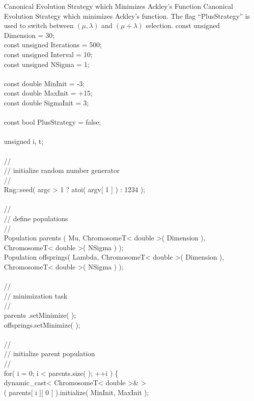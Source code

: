 \begin{programlisting}{Canonical Evolution Strategy which Minimizes Ackley's Function}{
    Canonical Evolution Strategy which minimizes Ackley's function.
    The flag ``PlusStrategy'' is used to switch between $(\mu,\lambda)$
    and $(\mu+\lambda)$ selection.}
    const unsigned Dimension    = 30;\\
    const unsigned Iterations   = 500;\\
    const unsigned Interval     = 10;\\
    const unsigned NSigma       = 1;\\
\\
    const double   MinInit      = -3;\\
    const double   MaxInit      = +15;\\
    const double   SigmaInit    = 3;\\
\\
    const bool     PlusStrategy = false;\\
\\
    unsigned       i, t;\\
\\
    //\\
    // initialize random number generator\\
    //\\
    Rng::seed( argc > 1 ? atoi( argv[ 1 ] ) : 1234 );\\
\\
    //\\
    // define populations\\
    //\\
    Population parents   ( Mu,     ChromosomeT< double >( Dimension ),\\
                                   ChromosomeT< double >( NSigma    ) );\\
    Population offsprings( Lambda, ChromosomeT< double >( Dimension ),\\
                                   ChromosomeT< double >( NSigma    ) );\\
\\
    //\\
    // minimization task\\
    //\\
    parents   .setMinimize( );\\
    offsprings.setMinimize( );\\
\\
    //\\
    // initialize parent population\\
    //\\
    for( i = 0; i < parents.size( ); ++i ) \{\\
        dynamic_cast< ChromosomeT< double >& >\\
            ( parents[ i ][ 0 ] ).initialize( MinInit,   MaxInit   );\\

\end{programlisting}
